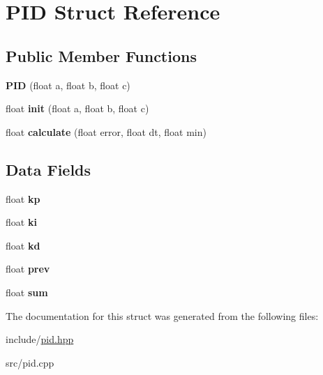 \hypertarget{structPID}{}\section{P\+ID Struct Reference}
\label{structPID}
\subsection*{Public Member Functions}
\begin{DoxyCompactItemize}
\item 
\mbox{\label{structPID_ac5b3e2a5ad35e07517f40b8164821f8e}} 
{\bfseries P\+ID} (float a, float b, float c)
\item 
\mbox{\label{structPID_a43370ace90e60c06253f9322101e3517}} 
float {\bfseries init} (float a, float b, float c)
\item 
\mbox{\label{structPID_a7d7903c58db1a8b6c63a6f40672d3765}} 
float {\bfseries calculate} (float error, float dt, float min)
\end{DoxyCompactItemize}
\subsection*{Data Fields}
\begin{DoxyCompactItemize}
\item 
\mbox{\label{structPID_a9bff6d497fdd262f6f0f74a76604d22a}} 
float {\bfseries kp}
\item 
\mbox{\label{structPID_af2b185d6025a735e294c3ca698562648}} 
float {\bfseries ki}
\item 
\mbox{\label{structPID_ac8f8dd4ddd347ff859db4e1dc3af90d5}} 
float {\bfseries kd}
\item 
\mbox{\label{structPID_ab1935e94bf22e1c6f8565a0677ab0871}} 
float {\bfseries prev}
\item 
\mbox{\label{structPID_a04f280906a9f186e64100b3a58775a71}} 
float {\bfseries sum}
\end{DoxyCompactItemize}


The documentation for this struct was generated from the following files\+:\begin{DoxyCompactItemize}
\item 
include/\hyperlink{pid_8hpp}{pid.\+hpp}\item 
src/pid.\+cpp\end{DoxyCompactItemize}
